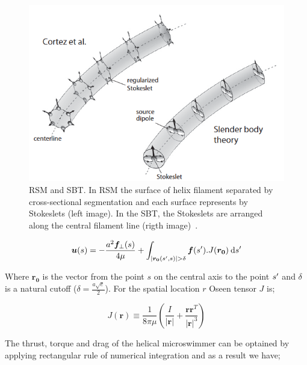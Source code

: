 \documentclass[12pt,a4paper,titlepage]{report}
\begin{document}
\begin{figure}
  \centering
    \includegraphics[width=1.0\textwidth]{Stoks}
  \caption[RSM and SBT]{\ac*{RSM} and \ac*{SBT}. In \ac*{RSM} the surface of helix filament separated by 
cross-sectional segmentation and each surface represents by 
Stokeslets (left image). In the \ac*{SBT}, the Stokeslets are arranged along the 
central filament line (rigth image)~\citep{rodenborn2013propulsion}.}
  \label{Stoks}
\end{figure}




\begin{equation}
 \bm{u}(s) = -\frac{a^2 \bm{f}_\perp (s)}{4\mu} + \int_{|\bm{r_0}(s\rq{},s)| > \delta } \bm{f}(s\rq{}).J(\bm{r_0})\: \mathrm{d}s\rq{}
\label{dipole_stokes}
\end{equation}



Where $\bm{r_0}$ is the vector from the point $s$ on the central axis to the point $s\rq{}$ and $\delta$ is
 a natural cutoff ($\delta = \frac{a\sqrt{e}}{2}$). For the spatial location $r$ Oseen tensor $J$ is;

 
\begin{equation}
 J(\bm{r}) \equiv \frac{1}{8\pi \mu} (\frac{I}{|\bm{r}|} + \frac{\bm{rr}^T}{|\bm{r}|^3})
\label{Oseen}
\end{equation}

The thrust, torque and drag of the helical microswimmer can be optained by applying rectangular rule of
numerical integration and as a result we have;
\end{document}
